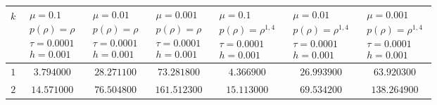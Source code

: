 \begin{landscape}
\begin{table}[]
\begin{tabular}{|c|c|c|c|c|c|c|}
\hline
$k$          & $\begin{array}{c}\mu = 0.1\\p(\rho) = \rho\\\tau = 0.0001\\h = 0.001\end{array}$ & $\begin{array}{c}\mu = 0.01\\p(\rho) = \rho\\\tau = 0.0001\\h = 0.001\end{array}$ & $\begin{array}{c}\mu = 0.001\\p(\rho) = \rho\\\tau = 0.0001\\h = 0.001\end{array}$ & $\begin{array}{c}\mu = 0.1\\p(\rho) = \rho^{1,4}\\\tau = 0.0001\\h = 0.001\end{array}$ & $\begin{array}{c}\mu = 0.01\\p(\rho) = \rho^{1,4}\\\tau = 0.0001\\h = 0.001\end{array}$ & \multicolumn{1}{c|}{$\begin{array}{c}\mu = 0.001\\p(\rho) = \rho^{1,4}\\\tau = 0.0001\\h = 0.001\end{array}$} \\ \hline
$1$          & $3.794000$                                                   & $28.271100$                                                  & $73.281800$                                                  & $4.366900$                                                         & $26.993900$                                                        & \multicolumn{1}{c|}{$63.920300$}                                                        \\ \hline
$2$          & $14.571000$                                                  & $76.504800$                                                  & $161.512300$                                                 & $15.113000$                                                        & $69.534200$                                                        & \multicolumn{1}{c|}{$138.264900$}                                                       \\ \hline

\end{tabular}
\end{table}
\end{landscape}
